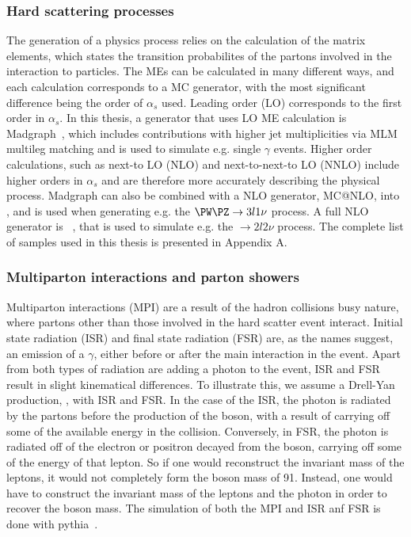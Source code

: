 \subsubsection*{Hard scattering processes}
\noindent
\justify
The generation of a physics process relies on the calculation of the matrix elements, which states the transition probabilites of the partons involved in the interaction to particles. 
The MEs can be calculated in many different ways, and each calculation corresponds to a MC generator, with the most significant difference being the order of $\alpha_{s}$ used. 
Leading order (LO) corresponds to the first order in $\alpha_{s}$. 
In this thesis, a generator that uses LO ME calculation is Madgraph~\cite{Alwall:2014hca}, which includes contributions with higher jet multiplicities via MLM~\cite{Mangano:2006rw} multileg matching and is used to simulate e.g. single $\gamma$ events.
Higher order calculations, such as next-to LO (NLO) and next-to-next-to LO (NNLO) include higher orders in $\alpha_{s}$ and are therefore more accurately describing the physical process. 
Madgraph can also be combined with a NLO generator, MC@NLO, into \MGvATNLO, and is used when generating e.g. the $\PW\PZ\rightarrow 3l1\nu$ process.
A full NLO generator is \POWHEG~\cite{Oleari:2010nx,Alioli:2009je}, that is used to simulate e.g. the \ttbar$\rightarrow2l2\nu$ process. 
The complete list of samples used in this thesis is presented in Appendix A.
\subsubsection*{Multiparton interactions and parton showers}
\noindent
\justify
Multiparton interactions (MPI) are a result of the hadron collisions busy nature, where partons other than those involved in the hard scatter event interact. 
Initial state radiation (ISR) and final state radiation (FSR) are, as the names suggest, an emission of a $\gamma$, either before or after the main interaction in the event.
Apart from both types of radiation are adding a photon to the event, ISR and FSR result in slight kinematical differences. 
To illustrate this, we assume a Drell-Yan production, \Zee, with ISR and FSR. 
In the case of the ISR, the photon is radiated by the partons before the production of the \PZ boson, with a result of carrying off some of the available energy in the collision. 
Conversely, in FSR, the photon is radiated off of the electron or positron decayed from the \PZ boson, carrying off some of the energy of that lepton. 
So if one would reconstruct the invariant mass of the leptons, it would not completely form the \PZ boson mass of 91\GeV. 
Instead, one would have to construct the invariant mass of the leptons and the photon in order to recover the \PZ boson mass. 
The simulation of both the MPI and ISR anf FSR is done with {\sc pythia}~\cite{Sjostrand:2014zea}. 
